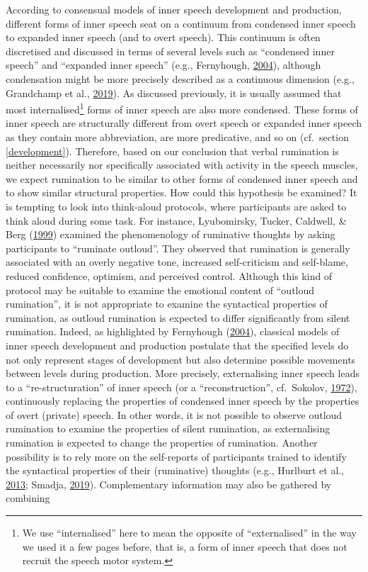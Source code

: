 \documentclass[a4paper,12pt,twoside,onecolumn,openright,final,oldfontcommands]{memoir}
\let\rmarkdownfootnote\footnote%
\def\footnote{\protect\rmarkdownfootnote}
\begin{document}
According to consensual models of inner speech development and production, different forms of inner speech seat on a continuum from condensed inner speech to expanded inner speech (and to overt speech). This continuum is often discretised and discussed in terms of several levels such as \enquote{condensed inner speech} and \enquote{expanded inner speech} (e.g., Fernyhough, \protect\hyperlink{ref-fernyhough_alien_2004}{2004}), although condensation might be more precisely described as a continuous dimension (e.g., Grandchamp et al., \protect\hyperlink{ref-grandchamp_condensation_2019}{2019}). As discussed previously, it is usually assumed that most internalised\footnote{We use \enquote{internalised} here to mean the opposite of \enquote{externalised} in the way we used it a few pages before, that is, a form of inner speech that does not recruit the speech motor system.} forms of inner speech are also more condensed. These forms of inner speech are structurally different from overt speech or expanded inner speech as they contain more abbreviation, are more predicative, and so on (cf.~section \ref{development}). Therefore, based on our conclusion that verbal rumination is neither necessarily nor specifically associated with activity in the speech muscles, we expect rumination to be similar to other forms of condensed inner speech and to show similar structural properties. How could this hypothesis be examined? It is tempting to look into think-aloud protocols, where participants are asked to think aloud during some task. For instance, Lyubomirsky, Tucker, Caldwell, \& Berg (\protect\hyperlink{ref-lyubomirsky_why_1999}{1999}) examined the phenomenology of ruminative thoughts by asking participants to \enquote{ruminate outloud}. They observed that rumination is generally associated with an overly negative tone, increased self-criticism and self-blame, reduced confidence, optimism, and perceived control. Although this kind of protocol may be suitable to examine the emotional content of \enquote{outloud rumination}, it is not appropriate to examine the syntactical properties of rumination, as outloud rumination is expected to differ significantly from silent rumination. Indeed, as highlighted by Fernyhough (\protect\hyperlink{ref-fernyhough_alien_2004}{2004}), classical models of inner speech development and production postulate that the specified levels do not only represent stages of development but also determine possible movements between levels during production. More precisely, externalising inner speech leads to a \enquote{re-structuration} of inner speech (or a ``reconstruction'', cf.~Sokolov, \protect\hyperlink{ref-sokolov_inner_1972}{1972}), continuously replacing the properties of condensed inner speech by the properties of overt (private) speech. In other words, it is not possible to observe outloud rumination to examine the properties of silent rumination, as externalising rumination is expected to change the properties of rumination. Another possibility is to rely more on the self-reports of participants trained to identify the syntactical properties of their (ruminative) thoughts (e.g., Hurlburt et al., \protect\hyperlink{ref-Hurlburt2013}{2013}; Smadja, \protect\hyperlink{ref-smadja_parole_2019}{2019}). Complementary information may also be gathered by combining 
\end{document}
